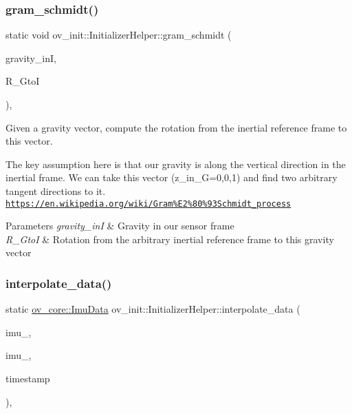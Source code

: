 \subsubsection{\texorpdfstring{gram\+\_\+schmidt()}{gram\_schmidt()}}
{\footnotesize\ttfamily static void ov\+\_\+init\+::\+Initializer\+Helper\+::gram\+\_\+schmidt (\begin{DoxyParamCaption}\item[{const Eigen\+::\+Vector3d \&}]{gravity\+\_\+inI,  }\item[{Eigen\+::\+Matrix3d \&}]{R\+\_\+\+GtoI }\end{DoxyParamCaption})\hspace{0.3cm}{\ttfamily [inline]}, {\ttfamily [static]}}



Given a gravity vector, compute the rotation from the inertial reference frame to this vector. 

The key assumption here is that our gravity is along the vertical direction in the inertial frame. We can take this vector (z\+\_\+in\+\_\+G=0,0,1) and find two arbitrary tangent directions to it. \href{https://en.wikipedia.org/wiki/Gram%E2%80%93Schmidt_process}{\tt https\+://en.\+wikipedia.\+org/wiki/\+Gram\%\+E2\%80\%93\+Schmidt\+\_\+process}


\begin{DoxyParams}{Parameters}
{\em gravity\+\_\+inI} & Gravity in our sensor frame \\
\hline
{\em R\+\_\+\+GtoI} & Rotation from the arbitrary inertial reference frame to this gravity vector \\
\hline
\end{DoxyParams}
\mbox{\label{classov__init_1_1InitializerHelper_aa5c39a05a5c4328b02907012922fe4cf}} 
\subsubsection{\texorpdfstring{interpolate\+\_\+data()}{interpolate\_data()}}
{\footnotesize\ttfamily static \hyperlink{structov__core_1_1ImuData}{ov\+\_\+core\+::\+Imu\+Data} ov\+\_\+init\+::\+Initializer\+Helper\+::interpolate\+\_\+data (\begin{DoxyParamCaption}\item[{const \hyperlink{structov__core_1_1ImuData}{ov\+\_\+core\+::\+Imu\+Data} \&}]{imu\+\_,  }\item[{const \hyperlink{structov__core_1_1ImuData}{ov\+\_\+core\+::\+Imu\+Data} \&}]{imu\+\_,  }\item[{double}]{timestamp }\end{DoxyParamCaption})\hspace{0.3cm}{\ttfamily [inline]}, {\ttfamily [static]}}



